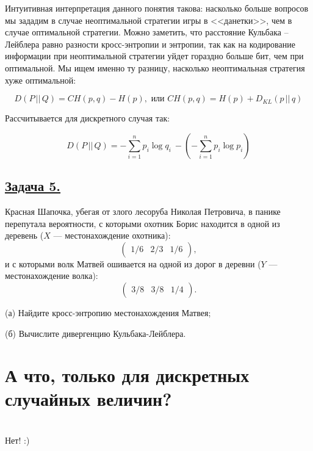     Интуитивная интерпретация данного понятия такова: насколько больше вопросов мы зададим в случае неоптимальной стратегии игры в <<данетки>>, чем в случае оптимальной стратегии. Можно заметить, что расстояние Кульбака -- Лейблера равно разности кросс-энтропии и энтропии, так как на кодирование информации при неоптимальной стратегии уйдет гораздно больше бит, чем при оптимальной. Мы ищем именно ту разницу, насколько неоптимальная стратегия хуже оптимальной: 
    
    \[D(P\, ||\, Q)= CH(p,q) - H(p), \text{ или } CH(p, q)=H(p)+D_{KL}(p\, || \, q)\]
    
    Рассчитывается для дискретного случая так:

    \[D(P\, ||\, Q)=  - \sum\limits_{i=1}^n p_i\log q_i\ - ( - \sum\limits_{i=1}^n p_i\log p_i)\]



\subsection*{\hyperref[sec:sol_problem5]{Задача 5.}}\label{sec:problem5} Красная Шапочка, убегая от злого лесоруба Николая Петровича, в панике перепутала вероятности, с которыми охотник Борис находится в одной из деревень ($X$ --- местонахождение охотника):
\[\begin{pmatrix}
    1/6 & 2/3 & 1/6
\end{pmatrix} , \] и с которыми волк Матвей ошивается на одной из дорог в деревни ($Y$ --- местонахождение волка):
\[\begin{pmatrix}
    3/8 & 3/8 & 1/4 
\end{pmatrix} .\]

(а) Найдите кросс-энтропию местонахождения Матвея;

(б) Вычислите дивергенцию Кульбака-Лейблера.

\section*{А что, только для дискретных случайных величин?}~\
\\

Нет! :)

